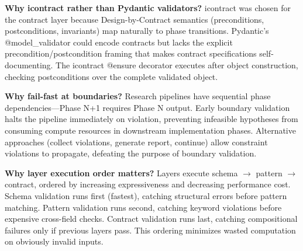 \textbf{Why icontract rather than Pydantic validators?} icontract was chosen for the contract layer because Design-by-Contract semantics (preconditions, postconditions, invariants) map naturally to phase transitions. Pydantic's @model\_validator could encode contracts but lacks the explicit precondition/postcondition framing that makes contract specifications self-documenting. The icontract @ensure decorator executes after object construction, checking postconditions over the complete validated object.

\textbf{Why fail-fast at boundaries?} Research pipelines have sequential phase dependencies---Phase N+1 requires Phase N output. Early boundary validation halts the pipeline immediately on violation, preventing infeasible hypotheses from consuming compute resources in downstream implementation phases. Alternative approaches (collect violations, generate report, continue) allow constraint violations to propagate, defeating the purpose of boundary validation.

\textbf{Why layer execution order matters?} Layers execute schema $\rightarrow$ pattern $\rightarrow$ contract, ordered by increasing expressiveness and decreasing performance cost. Schema validation runs first (fastest), catching structural errors before pattern matching. Pattern validation runs second, catching keyword violations before expensive cross-field checks. Contract validation runs last, catching compositional failures only if previous layers pass. This ordering minimizes wasted computation on obviously invalid inputs.
